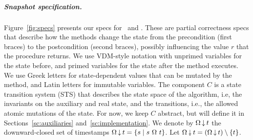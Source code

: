 %

\subparagraph*{Snapshot specification.}
 
%
Figure~\ref{fig:specs} presents our specs for \jyscan~and
\jywrite. These are partial correctness specs that describe how
the methods change the state from the precondition (first braces) to
the postcondition (second braces), possibly influencing the value $r$
that the procedure returns. We use VDM-style notation with unprimed
variables for the state before, and primed variables for the state
after the method executes. We use Greek letters for state-dependent
values that can be mutated by the method, and Latin letters for
immutable variables.
%
The component $C$ is a state transition system (STS) that describes the
state space of the algorithm, i.e, the invariants on the auxiliary and
real state, and the transitions, i.e., the allowed atomic mutations of
the state. For now, we keep $C$ abstract, but will define it in
Sections~\ref{sc:auxiliaries} and~\ref{sc:implementation}.
%
We denote by $\Omega\,{\downarrow}\,t$ the downward-closed set of
timestamps
$\ideal{\stableorder}{t} = \{ s \mid s\ {\stableorder}\ t \}$. Let
$\sideal{\stableorder}{t} = (\ideal{\stableorder}{t})\setminus\{t\}$.

